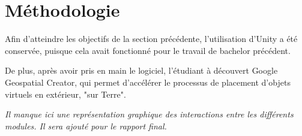 
\section{Méthodologie}

Afin d'atteindre les objectifs de la section précédente, l'utilisation d'Unity a été conservée, puisque cela avait fonctionné pour le travail de bachelor précédent.

De plus, après avoir pris en main le logiciel, l'étudiant à découvert Google Geospatial Creator, qui permet d'accélérer le processus de placement d'objets virtuels
en extérieur, "sur Terre".


\textit{Il manque ici une représentation graphique des interactions entre les différents modules. Il sera ajouté pour le rapport final.}


